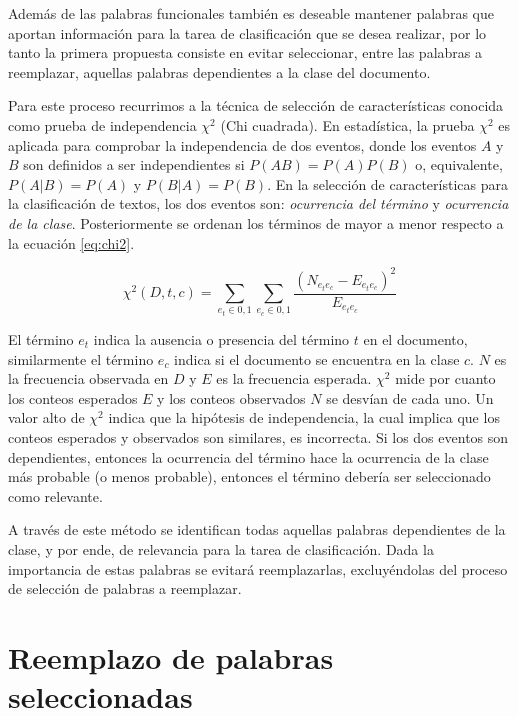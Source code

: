 Además de las palabras funcionales también es deseable mantener palabras que aportan información para la tarea de clasificación que se desea realizar, por lo tanto la primera propuesta consiste en evitar seleccionar, entre las palabras a reemplazar, aquellas  palabras dependientes a la clase del documento. 

Para este proceso recurrimos a la técnica de selección de características conocida como prueba de independencia $\chi^2$ (Chi cuadrada). En estadística, la prueba $\chi^2$ es aplicada para comprobar la independencia de dos eventos, donde los eventos $A$ y $B$ son definidos a ser independientes si  $P(AB)= P(A)P(B)$ o, equivalente, $P(A|B)=P(A)$ y $P(B|A)=P(B)$. En la selección de características para la clasificación de textos, los dos eventos son: \textit{ocurrencia del término} y \textit{ocurrencia de la clase}. Posteriormente se ordenan los términos de mayor a menor respecto a la ecuación \ref{eq:chi2}.

\begin{equation}
    \label{eq:chi2}
    \chi^2(D, t, c)= \sum_{e_t \in {0,1} }^{} \sum_{e_c \in {0,1} }^{} \frac{(N_{e_t e_c} - E _{e_t e_c})^2}{E_{e_t e_c}}
\end{equation}

El término $e_t$ indica la ausencia o presencia del término $t$ en el documento, similarmente el término $e_c$ indica si el documento se encuentra en la clase $c$. $N$ es la frecuencia observada en $D$ y $E$ es la frecuencia esperada. $\chi^2$ mide por cuanto los conteos esperados $E$ y los conteos observados $N$ se desvían de cada uno. Un valor alto de $\chi^2$ indica que la hipótesis de independencia, la cual implica que los conteos esperados y observados son similares, es incorrecta. Si los dos eventos son dependientes, entonces la ocurrencia del término hace la ocurrencia de la clase más probable (o menos probable), entonces el término debería ser seleccionado como relevante.

A través de este método se identifican todas aquellas palabras dependientes de la clase, y por ende, de relevancia para la tarea de clasificación. Dada la importancia de estas palabras se evitará reemplazarlas, excluyéndolas del proceso de selección de palabras a reemplazar.

\section{Reemplazo de palabras seleccionadas}

